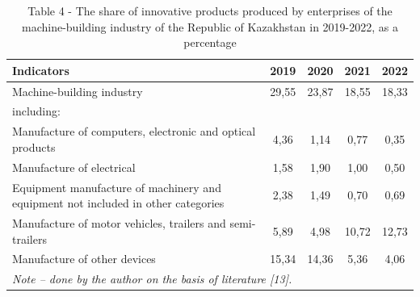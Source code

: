 \begin{table}[H]
\caption*{Table 4 - The share of innovative products produced by enterprises of the machine-building industry of the Republic of Kazakhstan in 2019-2022, as a percentage}
\centering
\begin{tabular}{|lcccc|}
\hline
\multicolumn{1}{|l|}{\textbf{Indicators}} &
  \multicolumn{1}{c|}{\textbf{2019}} &
  \multicolumn{1}{c|}{\textbf{2020}} &
  \multicolumn{1}{c|}{\textbf{2021}} &
  \textbf{2022} \\ \hline
\multicolumn{1}{|l|}{Machine-building industry} &
  \multicolumn{1}{c|}{29,55} &
  \multicolumn{1}{c|}{23,87} &
  \multicolumn{1}{c|}{18,55} &
  18,33 \\ \hline
\multicolumn{5}{|l|}{including:} \\ \hline
\multicolumn{1}{|l|}{Manufacture of computers, electronic and optical products} &
  \multicolumn{1}{c|}{4,36} &
  \multicolumn{1}{c|}{1,14} &
  \multicolumn{1}{c|}{0,77} &
  0,35 \\ \hline
\multicolumn{1}{|p{0.5\textwidth}|}{Manufacture of electrical} &
  \multicolumn{1}{c|}{1,58} &
  \multicolumn{1}{c|}{1,90} &
  \multicolumn{1}{c|}{1,00} &
  0,50 \\ \hline
\multicolumn{1}{|p{0.5\textwidth}|}{Equipment manufacture of machinery and equipment not included in other categories} &
  \multicolumn{1}{c|}{2,38} &
  \multicolumn{1}{c|}{1,49} &
  \multicolumn{1}{c|}{0,70} &
  0,69 \\ \hline
\multicolumn{1}{|p{0.5\textwidth}|}{Manufacture of motor vehicles, trailers and semi-trailers} &
  \multicolumn{1}{c|}{5,89} &
  \multicolumn{1}{c|}{4,98} &
  \multicolumn{1}{c|}{10,72} &
  12,73 \\ \hline
\multicolumn{1}{|p{0.5\textwidth}|}{Manufacture of other devices} &
  \multicolumn{1}{c|}{15,34} &
  \multicolumn{1}{c|}{14,36} &
  \multicolumn{1}{c|}{5,36} &
  4,06 \\ \hline
\multicolumn{5}{|l|}{\textit{Note – done by the author on the basis of literature {[}13{]}.}} \\ \hline
\end{tabular}
\end{table}


